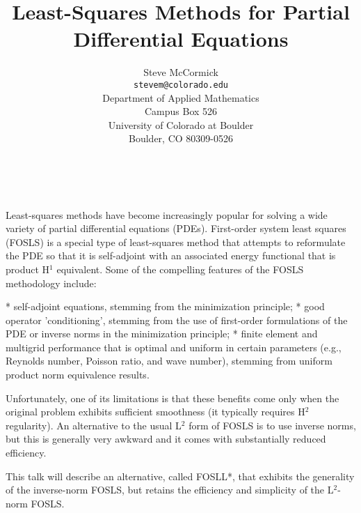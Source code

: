 \documentclass[11pt]{article}
\date{ ~ \hspace{-4mm}}
\title{Least-Squares Methods for Partial Differential Equations  }
\author{Steve McCormick \\ {\tt  stevem@colorado.edu} \\ Department of Applied Mathematics  \\  Campus Box 526  \\  University of Colorado at Boulder  \\  Boulder, CO 80309-0526}
\begin{document}
\maketitle
\thispagestyle{empty}





 



Least-squares methods have become increasingly popular for solving a wide
variety of partial differential equations (PDEs). First-order system least
squares (FOSLS) is a special type of least-squares method that attempts to
reformulate the PDE so that it is self-adjoint with an associated energy
functional that is product H$^1$ equivalent. Some of the compelling
features of the FOSLS methodology include:




   * self-adjoint equations, stemming from the minimization principle;
 \newline 
   * good operator 'conditioning', stemming from the use of first-order
     formulations of the PDE or inverse norms in the minimization
     principle;
 \newline 
   * finite element and multigrid performance that is optimal and uniform
     in certain parameters (e.g., Reynolds number, Poisson ratio, and wave
     number), stemming from uniform product norm equivalence results.
 \newline 




Unfortunately, one of its limitations is that these benefits come only when
the original problem exhibits sufficient smoothness (it typically requires
H$^2$ regularity). An alternative to the usual L$^2$ form
of FOSLS is to use inverse norms, but this is generally very awkward and
it comes with substantially reduced efficiency.




This talk will describe an alternative, called FOSLL*, that exhibits the
generality of the inverse-norm FOSLS, but retains the efficiency and
simplicity of the L$^2$-norm FOSLS.
\end{document}
